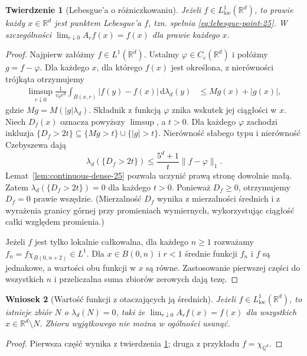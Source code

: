 \documentclass[11pt,a4paper,oneside]{book}
\numberwithin{equation}{chapter}
\theoremstyle{plain}
\newtheorem{twierdzenie}{Twierdzenie}[chapter]
\newtheorem{wniosek}[twierdzenie]{Wniosek}
\theoremstyle{definition}
\theoremstyle{remark}
\begin{document}
\begin{twierdzenie}[Lebesgue'a o różniczkowaniu]
\label{thm:lebesgue-diff-25}
Jeżeli $f\in L^1_{\mathrm{loc}}(\mathbb R^d)$, to
prawie każdy $x\in\mathbb R^d$ jest punktem Lebesgue'a
$f$, tzn. spełnia \eqref{eq:lebesgue-point-25}.
W szczególności
$\lim_{r\downarrow0}A_rf(x)=f(x)$ dla prawie każdego $x$.
\end{twierdzenie}
\begin{proof}
Najpierw załóżmy $f\in L^1(\mathbb R^d)$. Ustalmy
$\varphi\in C_c(\mathbb R^d)$ i połóżmy $g=f-\varphi$.
Dla każdego $x$, dla którego $f(x)$ jest określona,
z nierówności trójkąta otrzymujemy
\begin{align*}
 \limsup_{r\downarrow0}\frac1{v_dr^d}
 \int_{B(x,r)}|f(y)-f(x)|\,\mathrm d\lambda_d(y)
 &\le Mg(x)+|g(x)|,
\end{align*}
gdzie $Mg=M(|g|\lambda_d)$. Składnik z funkcją
$\varphi$ znika wskutek jej ciągłości w $x$.
Niech $D_f(x)$ oznacza powyższy $\limsup$, a $t>0$.
Dla każdego $\varphi$ zachodzi inkluzja
$\{D_f>2t\}\subseteq\{Mg>t\}\cup\{|g|>t\}$.
Nierówność słabego typu i nierówność Czebyszewa dają
\[
 \lambda_d(\{D_f>2t\})
 \le\frac{5^d+1}{t}\|f-\varphi\|_1.
\]
Lemat~\ref{lem:continuous-dense-25} pozwala uczynić
prawą stronę dowolnie małą. Zatem
$\lambda_d(\{D_f>2t\})=0$ dla każdego $t>0$.
Ponieważ $D_f\ge0$, otrzymujemy $D_f=0$ prawie
wszędzie. (Mierzalność $D_f$ wynika z mierzalności
średnich i z wyrażenia granicy górnej przy promieniach
wymiernych, wykorzystując ciągłość całki względem
promienia.)

Jeżeli $f$ jest tylko lokalnie całkowalna, dla każdego
$n\ge1$ rozważamy $f_n=f\chi_{B(0,n+2)}\in L^1$.
Dla $x\in B(0,n)$ i $r<1$ średnie funkcji
$f_n$ i $f$ są jednakowe, a wartości obu funkcji
w $x$ są równe. Zastosowanie pierwszej części do
wszystkich $n$ i przeliczalna suma zbiorów zerowych
dają tezę.
\end{proof}

\begin{wniosek}[Wartość funkcji z otaczających ją średnich]
\label{cor:diff-basis-25}
Jeżeli $f\in L^1_{\mathrm{loc}}(\mathbb R^d)$,
to istnieje zbiór $N$ o $\lambda_d(N)=0$, taki że
$\lim_{r\downarrow0}A_rf(x)=f(x)$ dla wszystkich
$x\in\mathbb R^d\setminus N$. Zbioru wyjątkowego
nie można w ogólności usunąć.
\end{wniosek}
\begin{proof}
Pierwsza część wynika z twierdzenia
\ref{thm:lebesgue-diff-25}; druga z przykładu
$f=\chi_{\mathbb Q^d}$.
\end{proof}
\end{document}
